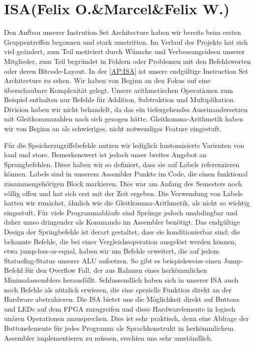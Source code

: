 
\section{ISA(Felix O.\&Marcel\&Felix W.)}

Den Aufbau unserer Instrution Set Architecture haben wir bereits beim ersten Gruppentreffen begonnen und stark umstritten. Im Verlauf des Projekts hat sich viel geändert, zum Teil motiviert durch Wünsche und Verbessungsideen unserer Mitglieder, zum Teil begründet in Fehlern oder Problemen mit den Befehlsworten oder deren Bitcode-Layout.
In der \autoref{AP:ISA} ist unsere endgültige Instruction Set Architecture zu sehen. Wir haben von Beginn an den Fokus auf eine überschaubare Komplexität gelegt. Unsere arithmetischen Operationen zum Beispiel enthalten nur Befehle für Addition, Subtraktion und Multiplikation. Division haben wir nicht behandelt, da das ein tiefergehendes Auseinandersetzen mit Gleitkommazahlen nach sich gezogen hätte.  Gleitkomma-Arithmetik haben wir von Beginn an als schwieriges, nicht notwendiges Feature eingestuft.

Für die Speicherzugriffsbefehle nutzen wir lediglich kustomisierte Varienten von load und store. Bemerkenswert ist jedoch unser breites Angebot an Sprungbefehlen. Diese haben wir so definiert, dass sie auf Labels referenzieren können. Labels sind in unserem Assembler Punkte im Code, die einen funktional zusammengehörigen Block markieren. Dies war am Anfang des Semesters noch völlig offen und hat sich erst mit der Zeit ergeben. Die Verwendung von Labels hatten wir zunächst, ähnlich wie die Gleitkomma-Arithmetik, als nicht so wichtig eingestuft. Für viele Programmabläufe sind Sprünge jedoch unabdingbar und daher umso dringender als Kommando im Assembler benötigt. Das endgültige Design der Springbefehle ist derart gestaltet, dass sie konditionierbar sind; die bekannte Befehle, die bei einer Vergleichsoperation ausgelöst werden können, etwa jump-less-or-equal, haben wir um Befehle erweitert, die auf jedem Statusflag-Status unserer ALU aufsetzen. So gibt es beispielsweise einen Jump-Befehl für den Overflow Fall, der aus Rahmen eines herkömmlichen Minimalassemblers herausfällt.
Schlussendlich haben sich in unserer ISA auch noch Befehle als nützlich erwiesen, die eine spezielle Funktion direkt an der Hardware abstrahieren. Die ISA bietet uns die Möglichkeit direkt auf Buttons und LEDs auf dem FPGA zuzugreifen und diese Hardwarelemente in logisch unären Operationen anzusprechen. Dies ist sehr praktisch, denn eine Abfrage der Buttonelemente für jedes Programm als Sprachkonstrukt in herkömmlichem Assembler implementieren zu müssen, erschien uns sehr umständlich.

